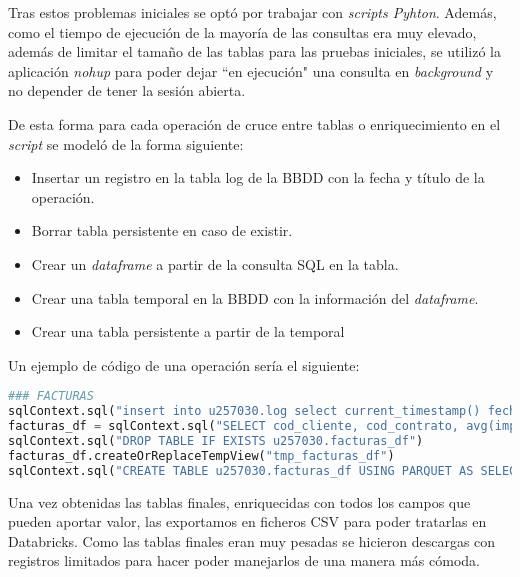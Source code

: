 Tras estos problemas iniciales se optó por trabajar con \textit{scripts Pyhton}\cite{python}. Además, como el tiempo de ejecución de la mayoría de las consultas era muy elevado, además de limitar el tamaño de las tablas para las pruebas iniciales, se utilizó la aplicación \textit{nohup}\cite{nohup} para poder dejar ``en ejecución" una consulta en \textit{background} y no depender de tener la sesión abierta.

De esta forma para cada operación de cruce entre tablas o enriquecimiento en el \textit{script} se modeló de la forma siguiente:
\begin{itemize}
    \item Insertar un registro en la tabla log de la BBDD con la fecha y título de la operación.
    \item Borrar tabla persistente en caso de existir.
    \item Crear un \textit{dataframe} a partir de la consulta SQL en la tabla.
    \item Crear una tabla temporal en la BBDD con la información del \textit{dataframe}.
    \item Crear una tabla persistente a partir de la temporal
\end{itemize}

Un ejemplo de código de una operación sería el siguiente:

\begin{minipage}{\linewidth}
\begin{lstlisting}[language=Python, caption=Ejemplo de operación en la creación de las tablas minables]
### FACTURAS
sqlContext.sql("insert into u257030.log select current_timestamp() fecha , 'FACTURAS' operacion")
facturas_df = sqlContext.sql("SELECT cod_cliente, cod_contrato, avg(imp_total_factu) as importe_medio FROM dwvp.ghh_factura GROUP BY cod_cliente, cod_contrato")
sqlContext.sql("DROP TABLE IF EXISTS u257030.facturas_df")
facturas_df.createOrReplaceTempView("tmp_facturas_df")
sqlContext.sql("CREATE TABLE u257030.facturas_df USING PARQUET AS SELECT * FROM tmp_facturas_df")
\end{lstlisting}
\end{minipage}  


Una vez obtenidas las tablas finales, enriquecidas con todos los campos que pueden aportar valor, las exportamos en ficheros CSV para poder tratarlas en Databricks. Como las tablas finales eran muy pesadas se hicieron descargas con registros limitados para hacer poder manejarlos de una manera más cómoda.

